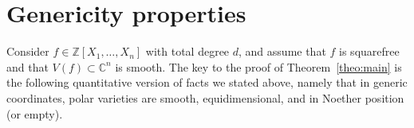 \documentclass[sigconf]{acmart}
\def\xb{\textit{\textbf{x}}}
\def\C{\mathbb{C}}
\def\jac{ \textbf{jac}}
\def\grad{\textbf{grad}}
\def\reg{\textrm{reg}}
\newcommand{\ZZ}{{\mathbb{Z}}}
\begin{document}



\section{Genericity properties}\label{sec:gen}

Consider $f \in \ZZ[X_1,\hdots,X_n]$ with total degree $d$, and assume
that $f$ is squarefree and that $V(f) \subset \C^n$ is smooth. The key
to the proof of Theorem~\ref{theo:main} is the following quantitative
version of facts we stated above, namely that in generic coordinates,
polar varieties are smooth, equidimensional, and in Noether position
(or empty).
\end{document}
